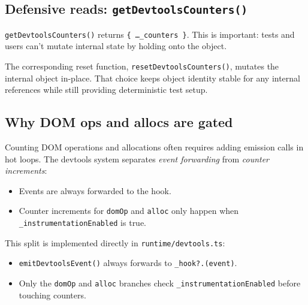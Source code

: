 \subsection{Defensive reads: \texttt{getDevtoolsCounters()}}

\texttt{getDevtoolsCounters()} returns \texttt{\{ \ldots\_counters \}}.
This is important: tests and users can't mutate internal state by holding onto the object.

The corresponding reset function, \texttt{resetDevtoolsCounters()}, mutates the internal object in-place. That choice keeps object identity stable for any internal references while still providing deterministic test setup.

\subsection{Why DOM ops and allocs are gated}

Counting DOM operations and allocations often requires adding emission calls in hot loops.
The devtools system separates \emph{event forwarding} from \emph{counter increments}:

\begin{itemize}
\item Events are always forwarded to the hook.
\item Counter increments for \texttt{domOp} and \texttt{alloc} only happen when \texttt{\_instrumentationEnabled} is true.
\end{itemize}

This split is implemented directly in \texttt{runtime/devtools.ts}:

\begin{itemize}
\item \texttt{emitDevtoolsEvent()} always forwards to \texttt{\_hook?.(event)}.
\item Only the \texttt{domOp} and \texttt{alloc} branches check \texttt{\_instrumentationEnabled} before touching counters.
\end{itemize}

